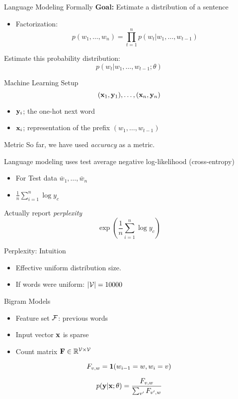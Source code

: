 \documentclass{beamer}
\begin{document}
\begin{frame}{Language Modeling Formally}
  \textbf{Goal:} Estimate a distribution of a sentence

  \begin{itemize}
  \item Factorization:
    \[ p(w_1, \ldots, w_n) = \prod_{t=1}^n p(w_t | w_1, \ldots, w_{t-1}) \]
  \end{itemize}

  Estimate this probability distribution:
  \[ p(w_t | w_1, \ldots, w_{t-1};\theta)\]
\end{frame}

\begin{frame}{Machine Learning Setup}
  \[ (\mathbf{x}_1, \mathbf{y}_1), \ldots, (\mathbf{x}_n, \mathbf{y}_n) \]
  \begin{itemize}
  \item $\mathbf{y}_i$; the one-hot next word
  \item $\mathbf{x}_i$; representation of the prefix $(w_1, \ldots, w_{t-1})$
  \end{itemize}
\end{frame}

\begin{frame}{Metric}
  So far, we have used \textit{accuracy} as a metric.

  Language modeling uses test average negative log-likelihood (cross-entropy)
  \begin{itemize}
    \item For Test data $\bar{w}_1, \ldots, \bar{w}_n$
    \item $\frac{1}{n}\sum_{i=1}^n \log y_c$
  \end{itemize}


  Actually report \textit{perplexity}
  \[ \exp(\frac{1}{n}\sum_{i=1}^n \log y_c) \]
\end{frame}

\begin{frame}{Perplexity: Intuition}
  \begin{itemize}
  \item Effective uniform distribution size.
  \item If words were uniform: $|\mathcal{V}| = 10000$
  \end{itemize}
\end{frame}


\begin{frame}{Bigram Models}
  \begin{itemize}
  \item Feature set $\mathcal{F}$: previous words
  \item Input vector $\mathbf{x}$ is sparse
  \item Count matrix $\mathbf{F} \in \mathbb{R}^{\mathcal{V} \times \mathcal{V}} $
  \end{itemize}

  \[ F_{v, w}  =  \mathbf{1}(w_{i-1} = w, w_i = v)  \]

  \[p(\mathbf{y} | \mathbf{x};\theta) = \frac{F_{v, w}}{\sum_{v'} F_{v', w}} \]
\end{frame}
\end{document}
